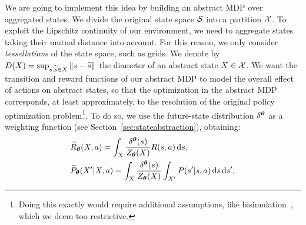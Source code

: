 We are going to implement this idea by building an abstract MDP over aggregated states. We divide the original state space $\mathcal{S}$ into a partition $\mathcal{X}$. To exploit the Lipschitz continuity of our environment, we need to aggregate states taking their mutual distance into account. For this reason, we only consider \textit{tessellations} of the state space, such as grids. 
%
We denote by $D(X) = \sup_{s,\widetilde{s}\in X}\left\|s-\widetilde{s}\right\|_{}$ the diameter of an abstract state $X\in\mathcal{X}$.
We want the transition and reward functions of our abstract MDP to model the overall effect of actions on abstract states, so that the optimization in the abstract MDP corresponds, at least approximately, to the resolution of the original policy optimization problem\footnote{Doing this exactly would require additional assumptions, like bisimulation~\citep{givan2003equivalence}, which we deem too restrictive.}. To do so, we use the future-state distribution $\delta^{\boldsymbol{\theta}}$ as a weighting function (see Section~\ref{sec:stateabstraction}), obtaining:
%
\begin{align}
	&\widetilde{R}_{\boldsymbol{\theta}}(X,a) = \int_{X}\frac{\delta^{\boldsymbol{\theta}}(s)}{Z_{\boldsymbol{\theta}}(X)}R(s,a)\,\mathrm{d} s,\label{eq:abrew2} \\
	&\widetilde{P}_{\boldsymbol{\theta}}(X'|X,a) = \int_{X} \frac{\delta^{\boldsymbol{\theta}}(s)}{Z_{\boldsymbol{\theta}}(X)} \int_{X'} P(s'|s,a)\,\mathrm{d} s\,\mathrm{d} s',\label{eq:abtran2}
\end{align}
